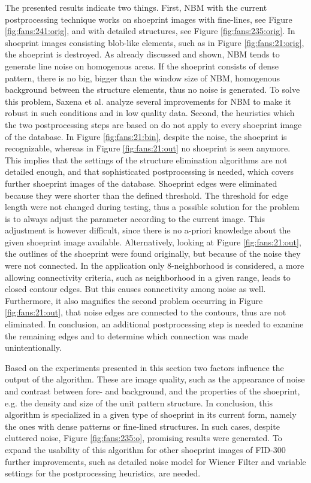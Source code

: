 \documentclass[draft,final]{vutinfth} %
\begin{document}
\par
The presented results indicate two things.
First, NBM with the current postprocessing technique works  on shoeprint images with fine-lines, see Figure \ref{fig:fans:241:orig}, and with detailed structures, see Figure \ref{fig:fans:235:orig}.
In shoeprint images consisting blob-like elements, such as in Figure \ref{fig:fans:21:orig}, the shoeprint is destroyed.
As already discussed and shown, NBM tends to generate line noise on homogenous areas.
If the shoeprint consists of dense pattern, there is no big, bigger than the window size of NBM, homogenous background between the structure elements, thus no noise is generated.
To solve this problem, Saxena et al. \cite{saxena2019niblack} analyze several improvements for NBM to make it robust in such conditions and in low quality data.
Second, the heuristics which the two postprocessing steps are based on do not apply to every shoeprint image of the database.
In Figure  \ref{fig:fans:21:bin}, despite the noise, the shoeprint is recognizable, whereas in Figure \ref{fig:fans:21:out} no shoeprint is seen anymore.
This implies that the settings of the structure elimination algorithms are not detailed enough, and that sophisticated postprocessing is needed, which covers further shoeprint images of the database.
Shoeprint edges were eliminated because they were shorter than the defined threshold.
The threshold for edge length were not changed during testing, thus a possible solution for the problem is to always adjust the parameter according to the current image.
This adjustment is however difficult, since there is no a-priori knowledge about the given shoeprint image available.
Alternatively, looking at Figure  \ref{fig:fans:21:out}, the outlines of the shoeprint were found originally, but because of the noise they were not connected.
In the application only 8-neighborhood is considered, a more allowing connectivity criteria, such as neighborhood in a given range, leads to closed contour edges.
But this causes connectivity among noise as well.
Furthermore, it also magnifies the second problem occurring in Figure \ref{fig:fans:21:out}, that noise edges are connected to the contours, thus are not eliminated.
In conclusion, an additional postprocessing step is needed to examine the remaining edges and to determine which connection was made unintentionally.
\par
Based on the experiments presented in this section two factors influence the output of the algorithm.
These are image quality, such as the appearance of noise and contrast between fore- and background, and the properties of the shoeprint, e.g. the density and size of the unit pattern structure.
In conclusion, this algorithm is specialized in a given type of shoeprint in its current form, namely the ones with dense patterns or fine-lined structures. 
In such cases, despite cluttered noise, Figure \ref{fig:fans:235:o}, promising results were generated.
To expand the usability of this algorithm for other shoeprint images of FID-300 further improvements, such as detailed noise model for Wiener Filter and variable settings for the postprocessing heuristics, are needed. 
\end{document}
